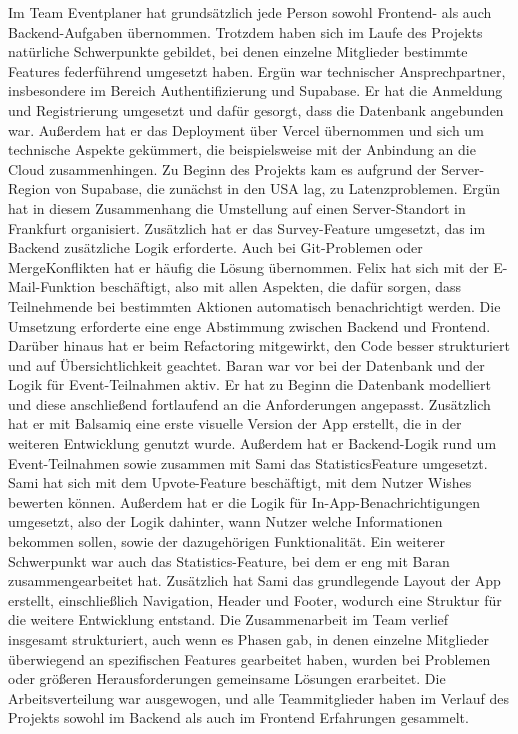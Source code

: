 \documentclass[a4paper,12pt]{article}
\begin{document}
Im Team Eventplaner hat grundsätzlich jede Person sowohl Frontend- als auch Backend-Aufgaben übernommen. Trotzdem haben sich im Laufe des Projekts natürliche Schwerpunkte gebildet, bei denen einzelne Mitglieder bestimmte Features federführend umgesetzt haben. Ergün war technischer Ansprechpartner, insbesondere im Bereich Authentifizierung und Supabase. Er hat die Anmeldung und Registrierung umgesetzt und dafür gesorgt, dass die Datenbank angebunden war. Außerdem hat er das Deployment über Vercel übernommen und sich um technische Aspekte gekümmert, die beispielsweise mit der Anbindung an die Cloud zusammenhingen. Zu Beginn des Projekts kam es aufgrund der Server-Region von Supabase, die zunächst in den USA lag, zu Latenzproblemen. Ergün hat in diesem Zusammenhang die Umstellung auf einen Server-Standort in Frankfurt organisiert. Zusätzlich hat er das Survey-Feature umgesetzt, das im Backend zusätzliche Logik erforderte. Auch bei Git-Problemen oder MergeKonflikten hat er häufig die Lösung übernommen. Felix hat sich mit der E-Mail-Funktion beschäftigt, also mit allen Aspekten, die dafür sorgen, dass Teilnehmende bei bestimmten Aktionen automatisch benachrichtigt werden. Die Umsetzung erforderte eine enge Abstimmung zwischen Backend und Frontend. Darüber hinaus hat er beim Refactoring mitgewirkt, den Code besser strukturiert und auf Übersichtlichkeit geachtet. Baran war vor bei der Datenbank und der Logik für Event-Teilnahmen aktiv. Er hat zu Beginn die Datenbank modelliert und diese anschließend fortlaufend an die Anforderungen angepasst. Zusätzlich hat er mit Balsamiq eine erste visuelle Version der App erstellt, die in der weiteren Entwicklung genutzt wurde. Außerdem hat er Backend-Logik rund um Event-Teilnahmen sowie zusammen mit Sami das StatisticsFeature umgesetzt. Sami hat sich mit dem Upvote-Feature beschäftigt, mit dem Nutzer Wishes bewerten können. Außerdem hat er die Logik für In-App-Benachrichtigungen umgesetzt, also der Logik dahinter, wann Nutzer welche Informationen bekommen sollen, sowie der dazugehörigen Funktionalität. Ein weiterer Schwerpunkt war auch das Statistics-Feature, bei dem er eng mit Baran zusammengearbeitet hat. Zusätzlich hat Sami das grundlegende Layout der App erstellt, einschließlich Navigation, Header und Footer, wodurch eine Struktur für die weitere Entwicklung entstand. Die Zusammenarbeit im Team verlief insgesamt strukturiert, auch wenn es Phasen gab, in denen einzelne Mitglieder überwiegend an spezifischen Features gearbeitet haben, wurden bei Problemen oder größeren Herausforderungen gemeinsame Lösungen erarbeitet. Die Arbeitsverteilung war ausgewogen, und alle Teammitglieder haben im Verlauf des Projekts sowohl im Backend als auch im Frontend Erfahrungen gesammelt.
\end{document}
